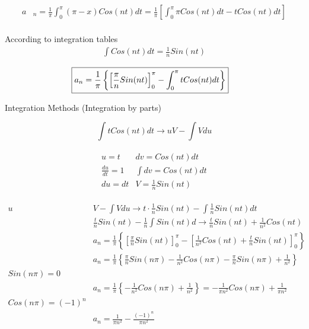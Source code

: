 \documentclass{article}
\begin{document}
\begin{align*}
    a&_n=\frac{1}{\pi} \int_{0}^{\pi}(\pi -x)Cos(nt)dt = \frac{1}{\pi}\left [ \int_{0}^{\pi} \pi Cos(nt)dt -tCos(nt)dt \right]\\   
\end{align*}

According to integration tables
\begin{align*}
 \int Cos(nt)dt = \frac{1}{n}Sin(nt)   
\end{align*}

\begin{align*}
   \Aboxed { a_n=\frac{1}{\pi} \left \{\left [\frac{\pi}{n} Sin(nt) \right ]_{0}^{\pi}      - \int_{0}^{\pi} tCos(nt)dt\right \}}
\end{align*}

Integration Methods (Integration by parts)

\begin{equation}
    \int tCos(nt)dt \rightarrow uV- \int V du
\end{equation}

\begin{align*}
    \begin{matrix}
u=t & dv=Cos(nt)dt\\ 
\frac{du}{dt}=1& \int dv =Cos(nt)dt\\ 
 du=dt& V=\frac{1}{n} Sin(nt)
\end{matrix}
\end{align*}

\begin{align*}
    u&V- \int V du \rightarrow t \cdot \frac{1}{n} Sin(nt)- \int \frac{1}{n} Sin(nt)dt\\
   &\frac{t}{n} Sin(nt)- \frac{1}{n} \int  Sin(nt)d \rightarrow  \frac{t}{n} Sin(nt)+ \frac{1}{n^2} Cos(nt)\\
   &a_n=\frac{1}{\pi} \left \{\left [\frac{\pi}{n} Sin(nt) \right ]_{0}^{\pi}      - \left[  \frac{1}{n^2} Cos(nt)+ \frac{t}{n} Sin(nt)\right]_{0}^{\pi}        \right \}\\
   &a_n=\frac{1}{\pi}\left \{ \frac{\pi}{n} Sin(n \pi)- \frac{1}{n^2} Cos(n \pi)-\frac{\pi}{n} Sin(n \pi)+\frac{1}{n^2}  \right \}\\
   Sin(n \pi) =0 \\
    &a_n=\frac{1}{\pi}\left \{ - \frac{1}{n^2} Cos(n \pi)+\frac{1}{n^2}  \right \} = - \frac{1}{\pi n^2} Cos(n \pi)+\frac{1}{\pi n^2}\\
    Cos(n \pi)=(-1)^n\\
    &a_n=\frac{1}{\pi n^2}- \frac{(-1)^n}{\pi n^2}
\end{align*}
\end{document}
